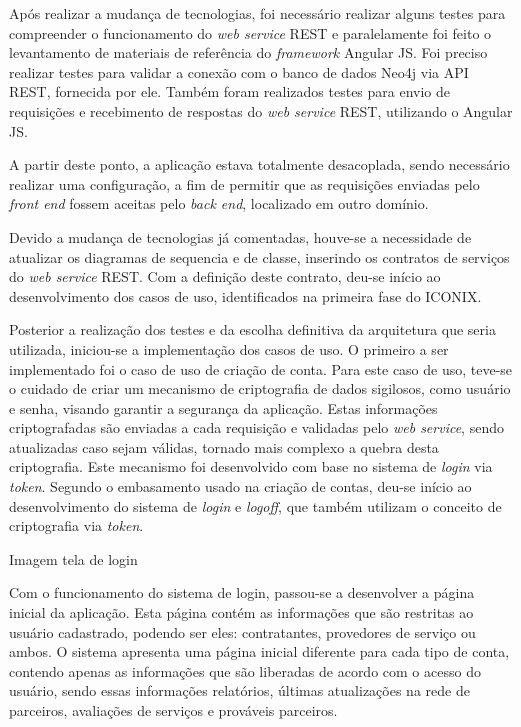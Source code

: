 \par Após realizar a mudança de tecnologias, foi necessário realizar alguns testes para compreender o funcionamento do \textit{web service} REST e paralelamente foi feito o levantamento de materiais de referência do \textit{framework} Angular JS. Foi preciso realizar testes para validar a conexão com o banco de dados Neo4j via API REST, fornecida por ele. Também foram realizados testes para envio de requisições e recebimento de respostas do \textit{web service} REST, utilizando o Angular JS.

\par A partir deste ponto, a aplicação estava totalmente desacoplada, sendo necessário realizar uma configuração, a fim de permitir que as requisições enviadas pelo \textit{front end} fossem aceitas pelo \textit{back end}, localizado em outro domínio.

\par Devido a mudança de tecnologias já comentadas, houve-se a necessidade de atualizar os diagramas de sequencia e de classe, inserindo os contratos de serviços do \textit{web service} REST. Com a definição deste contrato, deu-se início ao desenvolvimento dos casos de uso, identificados na primeira fase do ICONIX. 

\par Posterior a realização dos testes e da escolha definitiva da arquitetura que seria utilizada, iniciou-se a implementação dos casos de uso. O primeiro a ser implementado foi o caso de uso de criação de conta. Para este caso de uso, teve-se o cuidado de criar um mecanismo de criptografia de dados sigilosos, como usuário e senha, visando garantir a segurança da aplicação. Estas informações criptografadas são enviadas a cada requisição e validadas pelo \textit{web service}, sendo atualizadas caso sejam válidas, tornado mais complexo a quebra desta criptografia. Este mecanismo foi desenvolvido com base no sistema de \textit{login} via \textit{token}. Segundo o embasamento usado na criação de contas, deu-se início ao desenvolvimento do sistema de \textit{login} e \textit{logoff}, que também utilizam o conceito de criptografia via \textit{token}. 

Imagem tela de login

\par Com o funcionamento do sistema de login, passou-se a desenvolver a página inicial da aplicação. Esta página contém as informações que são restritas ao usuário cadastrado, podendo ser eles: contratantes, provedores de serviço ou ambos. O sistema apresenta uma página inicial diferente para cada tipo de conta, contendo apenas as informações que são liberadas de acordo com o acesso do usuário, sendo essas informações relatórios, últimas atualizações na rede de parceiros, avaliações de serviços e prováveis parceiros.

